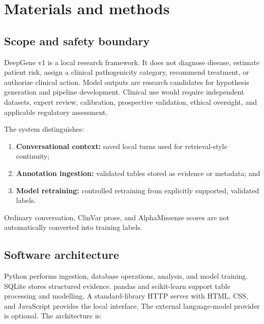 \documentclass[12pt,a4paper]{article}
\begin{document}
\section{Materials and methods}
\subsection{Scope and safety boundary}
DeepGene v1 is a local research framework. It does not diagnose disease, estimate patient risk, assign a clinical pathogenicity category, recommend treatment, or authorize clinical action. Model outputs are research candidates for hypothesis generation and pipeline development. Clinical use would require independent datasets, expert review, calibration, prospective validation, ethical oversight, and applicable regulatory assessment.

The system distinguishes:
\begin{enumerate}
\item \textbf{Conversational context:} saved local turns used for retrieval-style continuity;
\item \textbf{Annotation ingestion:} validated tables stored as evidence or metadata; and
\item \textbf{Model retraining:} controlled retraining from explicitly supported, validated labels.
\end{enumerate}
Ordinary conversation, ClinVar prose, and AlphaMissense scores are not automatically converted into training labels.

\subsection{Software architecture}
Python performs ingestion, database operations, analysis, and model training. SQLite stores structured evidence. pandas and scikit-learn support table processing and modelling. A standard-library HTTP server with HTML, CSS, and JavaScript provides the local interface. The external language-model provider is optional. The architecture is:
\begin{center}
\end{center}
\end{document}
